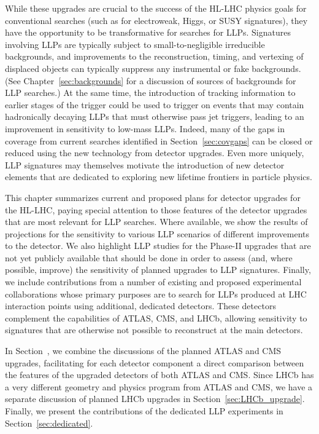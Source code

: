 While these upgrades are crucial to the success of the HL-LHC physics goals for conventional searches (such as for electroweak, Higgs, or SUSY signatures), they have the opportunity to be transformative for searches for LLPs. Signatures involving LLPs are typically subject to small-to-negligible irreducible backgrounds, and improvements to the reconstruction, timing, and vertexing of displaced objects can typically suppress any instrumental or fake backgrounds. (See Chapter~\ref{sec:backgrounds} for a discussion of sources of backgrounds for LLP searches.) At the same time, the introduction of tracking information to earlier stages of the trigger could be used to trigger on events that may contain hadronically decaying LLPs that must otherwise pass jet triggers, leading to an improvement in sensitivity to low-mass LLPs. Indeed, many of the gaps in coverage from current searches identified in Section~\ref{sec:covgaps} can be closed or reduced using the new technology from detector upgrades. Even more uniquely, LLP signatures may themselves motivate the introduction of new detector elements that are dedicated to exploring new lifetime frontiers in particle physics.

This chapter summarizes current and proposed plans for detector upgrades for the HL-LHC, paying special attention to those features of the detector upgrades that are most relevant for LLP searches. Where available, we show the results of projections for the sensitivity to various LLP scenarios of different improvements to the detector. We also highlight LLP studies for the Phase-II upgrades that are not yet publicly available that should be done in order to assess (and, where possible, improve) the sensitivity of planned upgrades to LLP signatures. Finally, we include contributions from a number of existing and proposed experimental collaborations whose primary purposes are to search for LLPs produced at LHC interaction points using additional, dedicated detectors. These detectors complement the capabilities of ATLAS, CMS, and LHCb, allowing sensitivity to signatures that are otherwise not possible to reconstruct at the main detectors.

In Section~\label{sec:upgradelhc}, we combine the discussions of the planned ATLAS and CMS upgrades, facilitating for each detector component a direct comparison between the features of the upgraded detectors of both ATLAS and CMS. Since LHCb has a very different geometry and physics program from ATLAS and CMS, we have a separate discussion of planned LHCb upgrades in Section~\ref{sec:LHCb_upgrade}. Finally, we present the contributions of the dedicated LLP experiments in Section~\ref{sec:dedicated}.





